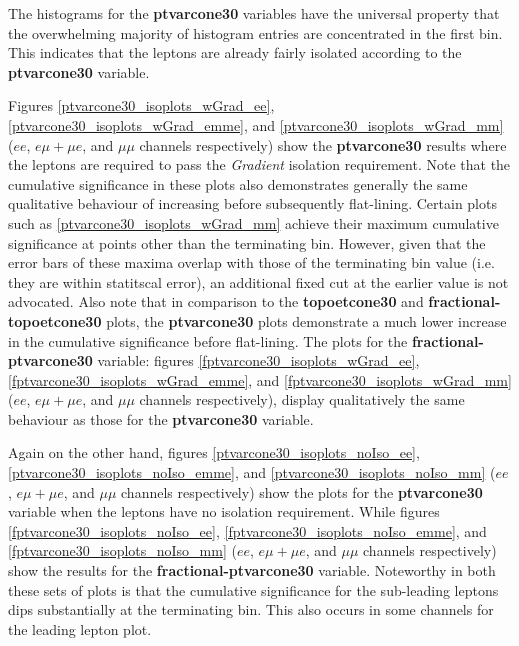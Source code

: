 The histograms for the \textbf{ptvarcone30} variables have the universal property that the overwhelming majority of histogram entries are concentrated in the first bin. This indicates that the leptons are already fairly isolated according to the \textbf{ptvarcone30} variable. 

Figures \ref{ptvarcone30_isoplots_wGrad_ee}, \ref{ptvarcone30_isoplots_wGrad_emme}, and \ref{ptvarcone30_isoplots_wGrad_mm} ($ee$, $e \mu + \mu e$, and $\mu\mu$ channels respectively) show the \textbf{ptvarcone30} results where the leptons are required to pass the \textit{Gradient} isolation requirement. Note that the cumulative significance in these plots also demonstrates generally the same qualitative behaviour of increasing before subsequently flat-lining. Certain plots such as \ref{ptvarcone30_isoplots_wGrad_mm} achieve their maximum cumulative significance at points other than the terminating bin. However, given that the error bars of these maxima overlap with those of the terminating bin value (i.e. they are within statitscal error), an additional fixed cut at the earlier value is not advocated. Also note that in comparison to the \textbf{topoetcone30} and \textbf{fractional-topoetcone30} plots, the \textbf{ptvarcone30} plots demonstrate a much lower increase in the cumulative significance before flat-lining. The plots for the \textbf{fractional-ptvarcone30} variable: figures \ref{fptvarcone30_isoplots_wGrad_ee}, \ref{fptvarcone30_isoplots_wGrad_emme}, and \ref{fptvarcone30_isoplots_wGrad_mm} ($ee$, $e \mu + \mu e$, and $\mu\mu$ channels respectively), display qualitatively the same behaviour as those for the \textbf{ptvarcone30} variable.

Again on the other hand, figures \ref{ptvarcone30_isoplots_noIso_ee}, \ref{ptvarcone30_isoplots_noIso_emme}, and \ref{ptvarcone30_isoplots_noIso_mm} ($ee$, $e \mu + \mu e$, and $\mu\mu$ channels respectively) show the plots for the \textbf{ptvarcone30} variable when the leptons have no isolation requirement. While figures \ref{fptvarcone30_isoplots_noIso_ee}, \ref{fptvarcone30_isoplots_noIso_emme}, and \ref{fptvarcone30_isoplots_noIso_mm} ($ee$, $e \mu + \mu e$, and $\mu\mu$ channels respectively) show the results for the \textbf{fractional-ptvarcone30} variable. Noteworthy in both these sets of plots is that the cumulative significance for the sub-leading leptons dips substantially at the terminating bin. This also occurs in some channels for the leading lepton plot.